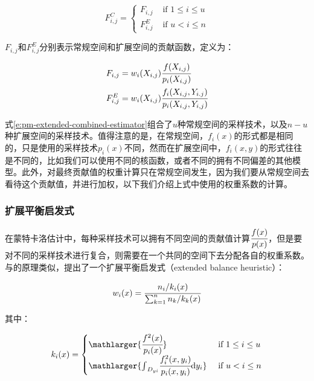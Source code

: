 \begin{equation}
	F^{C}_{i,j}=\begin{cases}
		F_{i,j} & \text{ if } 1\leq i\leq u\\
		F^{E}_{i,j}& \text{ if } u< i\leq n
	\end{cases}
\end{equation}

\noindent $F_{i,j}$和$F^{E}_{i,j}$分别表示常规空间和扩展空间的贡献函数，定义为：

\begin{equation}
	\begin{aligned}
		F_{i,j}&=w_i(X_{i,j}) \cfrac{f(X_{i,j})}{p_i(X_{i,j})}\\
		F^{E}_{i,j}&=w_i(X_{i,j}) \cfrac{f_i(X_{i,j},Y_{i.j})}{p_i(X_{i,j},Y_{i,j})}
	\end{aligned}
\end{equation}

式\ref{e:pm-extended-combined-estimator}组合了$u$种常规空间的采样技术，以及$n-u$种扩展空间的采样技术。值得注意的是，在常规空间，$f_i(x)$的形式都是相同的，只是使用的采样技术$p_i(x)$不同，然而在扩展空间中，$f_i(x,y)$的形式往往是不同的，比如我们可以使用不同的核函数，或者不同的拥有不同偏差的其他模型。此外，对最终贡献值的权重计算只在常规空间发生，因为我们要从常规空间去看待这个贡献值，并进行加权，以下我们介绍上式中使用的权重系数的计算。




\subsubsection{扩展平衡启发式}
在蒙特卡洛估计中，每种采样技术可以拥有不同空间的贡献值计算$ \cfrac{f(x)}{p(x)}$，但是要对不同的采样技术进行复合，则需要在一个共同的空间下去分配各自的权重系数。与\cite{a:RobustMonteCarloMethodsforLightTransportSimulation}的原理类似，\cite{a:UnifyingPointsBeamsandPathsinVolumetricLightTransportSimulation}提出了一个扩展平衡启发式（extended balance heuristic）：

\begin{equation}
	w_i(x)= \cfrac{n_i/k_i(x)}{\sum^{n}_{k=1}n_k/k_k(x)}
\end{equation}

\noindent 其中：

\begin{equation}
	k_i(x)=\begin{cases}
		\mathlarger{ \cfrac{f^{2}(x)}{p_i(x)}} & \text{ if } 1\leq i\leq u\\
		\mathlarger{{\rm \int}_{D_{yi}} \cfrac{f^{2}_i(x,y_i)}{p_i(x,y_i)}{\rm d}y_i} & \text{ if } u<i\leq n
	\end{cases}
\end{equation}

